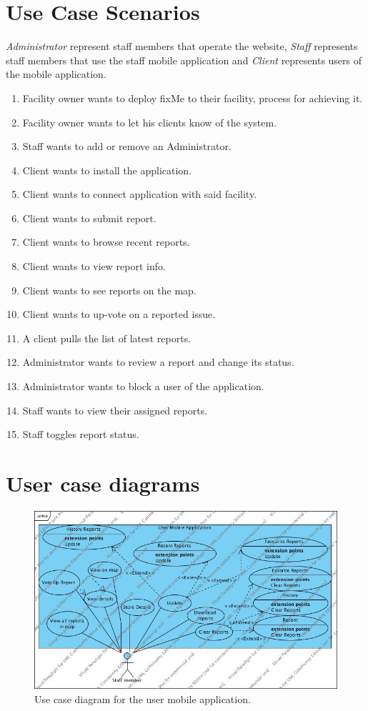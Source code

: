\documentclass[12pt]{ecsproject}     %
\begin{document}
\section{Use Case Scenarios}
\textit{Administrator} represent staff members that operate the website, \textit{Staff} represents staff members that use the staff mobile application and \textit{Client} represents users of the mobile application.

\begin{enumerate}
\item Facility owner wants to deploy fixMe to their facility, process for achieving it. 
\item Facility owner wants to let his clients know of the system. 
\item Staff wants to add or remove an Administrator. 
\item Client wants to install the application. 
\item Client wants to connect application with said facility. 
\item Client wants to submit report. 
\item Client wants to browse recent reports. 
\item Client wants to view report info. 
\item Client wants to see reports on the map. 
\item Client wants to up-vote on a reported issue.
\item A client pulls the list of latest reports. 
\item Administrator wants to review a report and change its status.
\item Administrator wants to block a user of the application. 
\item Staff wants to view their assigned reports.
\item Staff toggles report status.
\end{enumerate}


\section{User case diagrams}
\begin{figure}[h]
\includegraphics[scale=0.6]{uml/uma.jpg}
\caption{Use case diagram for the user mobile application.}
\end{figure}
\end{document}
